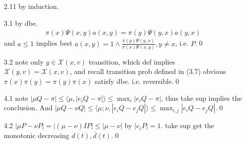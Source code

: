 \documentclass[paper=a4, fontsize=11pt]{scrartcl} %
\numberwithin{equation}{section} %
\numberwithin{figure}{section} %
\numberwithin{table}{section} %
\begin{document}
\begin{itemize}
	\item[2.11] by induction.
	\item[3.1] by dbe.
	\begin{align}
		\pi(x)\Psi(x,y)a(x,y) = \pi(y)\Psi(y,x)a(y,x)
	\end{align}
	and $a\leq 1$ implies best $a(x,y)=1\wedge \frac{\pi(y)\Psi(y,x)}{\pi(x)\Psi(x,y)} ,y\neq x$, i.e. $P$.\qed
	\item[3.2] note only $y\in \mathcal{X}(x,v)$ transition, which def implies $\mathcal{X}(y,v)=\mathcal{X}(x,v)$, and recall transition prob defined in (3.7) obvious $\pi(x)\pi(y)=\pi(y)\pi(x)$ satisfy dbe. i.e. reversible.\qed
	\item[4.1] note $|\mu Q-\pi|\leq \langle\mu,|e_i Q-\pi|\rangle \leq \max_i |e_i Q-\pi|$, thus take sup implies the conclusion. And $|\mu Q-\nu Q|\leq \langle \mu;\nu, |e_iQ-e_jQ|\rangle\leq \max_{i,j}|e_iQ-e_jQ|$.\qed
	\item[4.2] $|\mu P-\nu P|= |(\mu-\nu)IP|\leq |\mu-\nu|$ by $|e_iP|=1$. take sup get the monotonic decreasing $d(t),\overline{d}(t)$.\qed
\end{itemize}
\end{document}
